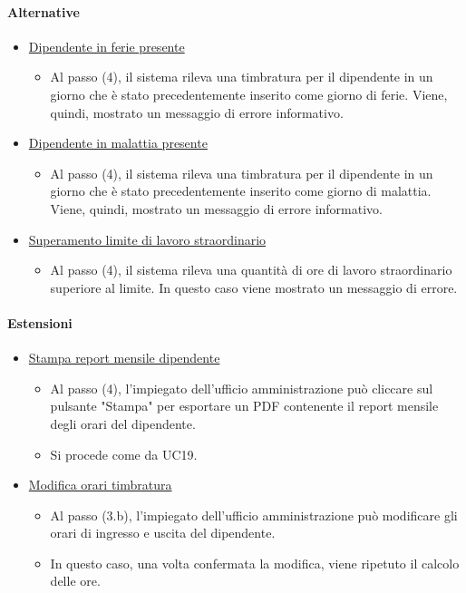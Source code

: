 \paragraph{Alternative}
\begin{itemize}
	\item \underline{Dipendente in ferie presente}
		\begin{itemize}
			\item Al passo (4), il sistema rileva una timbratura per il dipendente in un giorno che è stato precedentemente inserito come giorno di ferie. Viene, quindi, mostrato un messaggio di errore informativo.
		\end{itemize}
	\item \underline{Dipendente in malattia presente}
		\begin{itemize}
			\item Al passo (4), il sistema rileva una timbratura per il dipendente in un giorno che è stato precedentemente inserito come giorno di malattia. Viene, quindi, mostrato un messaggio di errore informativo.
		\end{itemize}
	\item \underline{Superamento limite di lavoro straordinario}
		\begin{itemize}
			\item Al passo (4), il sistema rileva una quantità di ore di lavoro straordinario superiore al limite. In questo caso viene mostrato un messaggio di errore.
		\end{itemize}
\end{itemize}
\paragraph{Estensioni}
\begin{itemize}
	\item \underline{Stampa report mensile dipendente}
		\begin{itemize}
			\item Al passo (4), l'impiegato dell'ufficio amministrazione può cliccare sul pulsante "Stampa" per esportare un PDF contenente il report mensile degli orari del dipendente.
			\item Si procede come da UC19.
		\end{itemize}
	\item \underline{Modifica orari timbratura}
		\begin{itemize}
			\item Al passo (3.b), l'impiegato dell'ufficio amministrazione può modificare gli orari di ingresso e uscita del dipendente.
			\item In questo caso, una volta confermata la modifica, viene ripetuto il calcolo delle ore.
		\end{itemize}
\end{itemize}